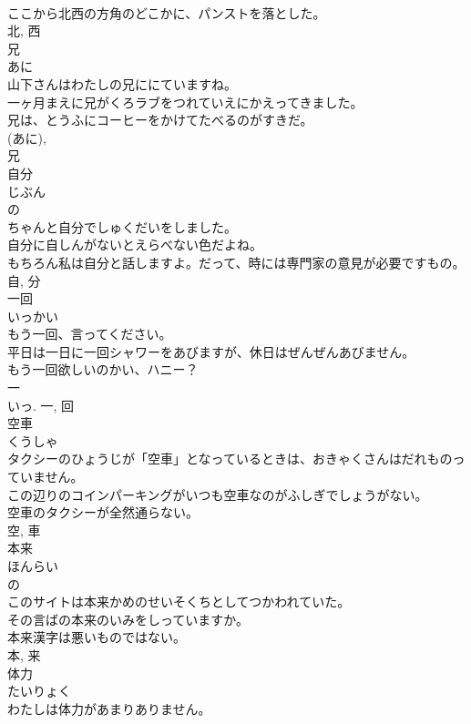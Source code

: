 \documentclass[8pt]{extreport}
\begin{document}
\begin{CJK}{UTF8}{min}
\\	ここから北西の方角のどこかに、パンストを落とした。	
\\	北, 西	
\\	兄	
\\	あに	
\\	山下さんはわたしの兄ににていますね。	
\\	一ヶ月まえに兄がくろラブをつれていえにかえってきました。	
\\	兄は、とうふにコーヒーをかけてたべるのがすきだ。	
\\	(あに), 
\\	兄	
\\	自分	
\\	じぶん	
\\	の 
\\	ちゃんと自分でしゅくだいをしました。	
\\	自分に自しんがないとえらべない色だよね。	
\\	もちろん私は自分と話しますよ。だって、時には専門家の意見が必要ですもの。	
\\	自, 分	
\\	一回	
\\	いっかい	
\\	もう一回、言ってください。	
\\	平日は一日に一回シャワーをあびますが、休日はぜんぜんあびません。	
\\	もう一回欲しいのかい、ハニー？	
\\	一 
\\	いっ.	一, 回	
\\	空車	
\\	くうしゃ	
\\	タクシーのひょうじが「空車」となっているときは、おきゃくさんはだれものっていません。	
\\	この辺りのコインパーキングがいつも空車なのがふしぎでしょうがない。	
\\	空車のタクシーが全然通らない。	
\\	空, 車	
\\	本来	
\\	ほんらい	
\\	の 
\\	このサイトは本来かめのせいそくちとしてつかわれていた。	
\\	その言ばの本来のいみをしっていますか。	
\\	本来漢字は悪いものではない。	
\\	本, 来	
\\	体力	
\\	たいりょく	
\\	わたしは体力があまりありません。	

\end{CJK}
\end{document}
